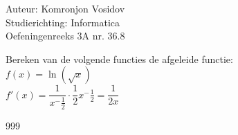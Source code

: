 \documentclass[a4paper]{article}
\begin{document}
	
	\noindent \large Auteur: Komronjon Vosidov \\
	\noindent \large Studierichting: Informatica\\
	\noindent \large Oefeningenreeks 3A nr. 36.8\\
	
	\medskip
	
	\normalsize
	Bereken van de volgende functies de afgeleide functie:\\
	
	$f(x) = \ln(\sqrt{x})$\\
	
	$f'(x) = \dfrac{1}{x^-\tfrac{1}{2}} \cdot \dfrac{1}{2} x^-\tfrac{1}{2} = \dfrac{1}{2x} $
	
	
\begin{thebibliography}{999}
\end{thebibliography}		
\end{document}
